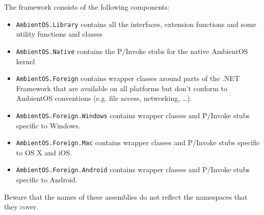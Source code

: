 \documentclass[a4paper]{article}
\begin{document}
The framework consists of the following components:

\begin{itemize}
  \item {\tt AmbientOS.Library} contains all the interfaces, extension functions and some utility functions and classes
  \item {\tt AmbientOS.Native} contains the P/Invoke stubs for the native AmbientOS kernel
  \item {\tt AmbientOS.Foreign} contains wrapper classes around parts of the .NET Framework that are available on all platforms but don't conform to AmbientOS conventions (e.g. file access, networking, \ldots).
  \item {\tt AmbientOS.Foreign.Windows} contains wrapper classes and P/Invoke stubs specific to Windows.
  \item {\tt AmbientOS.Foreign.Mac} contains wrapper classes and P/Invoke stubs specific to OS X and iOS.
  \item {\tt AmbientOS.Foreign.Android} contains wrapper classes and P/Invoke stubs specific to Android.
\end{itemize}

Beware that the names of these assemblies do not reflect the namespaces that they cover.
\end{document}
